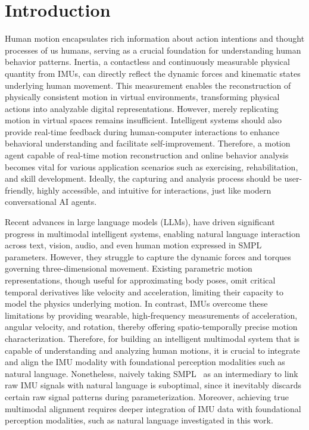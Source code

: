 \section{Introduction}
\label{sec:intro}

Human motion encapsulates rich information about action intentions and thought processes of us humans, serving as a crucial foundation for understanding human behavior patterns. Inertia, a contactless and continuously measurable physical quantity from IMUs, can directly reflect the dynamic forces and kinematic states underlying human movement. This measurement enables the reconstruction of physically consistent motion in virtual environments, transforming physical actions into analyzable digital representations. However, merely replicating motion in virtual spaces remains insufficient. Intelligent systems should also provide real-time feedback during human-computer interactions to enhance behavioral understanding and facilitate self-improvement. 
Therefore, a motion agent capable of real-time motion reconstruction and online behavior analysis becomes vital for various application scenarios such as exercising, rehabilitation, and skill development. Ideally, the capturing and analysis process should be user-friendly, highly accessible, and intuitive for interactions, just like modern conversational AI agents.

Recent advances in large language models (LLMs), have driven significant progress in multimodal intelligent systems, enabling natural language interaction across text, vision, audio, and even human motion expressed in SMPL~\cite{SMPL2015} parameters. However, they struggle to capture the dynamic forces and torques governing three-dimensional movement. Existing parametric motion representations, though useful for approximating body poses, omit critical temporal derivatives like velocity and acceleration, limiting their capacity to model the physics underlying motion. In contrast, IMUs overcome these limitations by providing wearable, high-frequency measurements of acceleration, angular velocity, and rotation, thereby offering spatio-temporally precise motion characterization. Therefore, for building an intelligent multimodal system that is capable of understanding and analyzing human motions, it is crucial to integrate and align the IMU modality with foundational perception modalities such as natural language. Nonetheless, naively taking SMPL~\cite{SMPL2015} as an intermediary to link raw IMU signals with natural language is suboptimal, since it inevitably discards certain raw signal patterns during parameterization. Moreover, achieving true multimodal alignment requires deeper integration of IMU data with foundational perception modalities, such as natural language investigated in this work.

